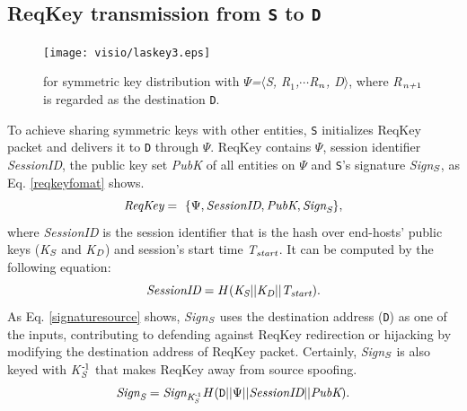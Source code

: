 \subsection{ReqKey transmission from {\tt S} to {\tt D}}
\label{reqkeytransmission}
\begin{figure}%
\begin{center}
\texttt{[image: visio/laskey3.eps]}
\caption{\namekey{} for symmetric key distribution with $\Psi$\emph{=}$\langle$\emph{S, R}$_1$\emph{,}$\cdots$\emph{R}$_\emph{n}$\emph{, D}$\rangle$, where \emph{R}$_{\emph{n+}1}$ is regarded as the destination {\tt D}.}\label{askeyfigure}
\end{center}
\vspace{-3mm}
\end{figure}
To achieve sharing symmetric keys with other entities, {\tt S} initializes ReqKey packet and %
delivers it to {\tt D} through $\Psi$.
ReqKey contains $\Psi$, session identifier \emph{SessionID}, the public key set \emph{PubK} of all entities on $\Psi$ and {\tt S}'s signature \emph{Sign}$_\emph{S}$, as Eq. \ref{reqkeyfomat} shows.
\begin{equation}\label{reqkeyfomat}
\emph{ReqKey} =~ \{\Psi, \emph{SessionID}, \emph{PubK}, \emph{Sign}_\emph{S}\},
\end{equation}
\noindent where \emph{SessionID} is the session identifier that is the hash over end-hosts' public keys (\emph{K}$_\emph{S}$ and \emph{K}$_\emph{D}$) and session's start time \emph{T}$_\emph{start}$. It can be computed by the following equation:
\begin{equation}\label{sessionidkey}
\emph{SessionID} = H(\emph{K}_\emph{S}\vert \vert \emph{K}_\emph{D}\vert \vert \emph{T}_{\emph{start}}).
\end{equation}
As Eq. \ref{signaturesource} shows, \emph{Sign}$_\emph{S}$ uses the destination address ({\tt D}) as one of the inputs, contributing to defending against ReqKey redirection or hijacking by modifying the destination address of ReqKey packet. %
Certainly, \emph{Sign}$_\emph{S}$ is also keyed with \emph{K}$_\emph{S}^{\emph{-}1}$ that makes ReqKey away from source spoofing.
\begin{equation}\label{signaturesource}
\emph{Sign}_\emph{S} = \emph{Sign}_{\emph{K}^{\emph{-}1}_\emph{S}}H({\tt D}\vert \vert \Psi \vert \vert \emph{SessionID} \vert \vert \emph{PubK}).
\end{equation}

